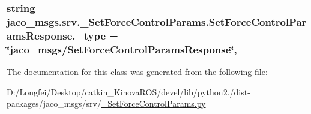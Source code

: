 \subsubsection[{\texorpdfstring{\+\_\+type}{_type}}]{\setlength{\rightskip}{0pt plus 5cm}string jaco\+\_\+msgs.\+srv.\+\_\+\+Set\+Force\+Control\+Params.\+Set\+Force\+Control\+Params\+Response.\+\_\+type = \char`\"{}jaco\+\_\+msgs/{\bf Set\+Force\+Control\+Params\+Response}\char`\"{}\hspace{0.3cm}{\ttfamily [static]}, {\ttfamily [private]}}\hypertarget{classjaco__msgs_1_1srv_1_1__SetForceControlParams_1_1SetForceControlParamsResponse_a2472e20c8a4d719aed1ca29213b233a1}{}\label{classjaco__msgs_1_1srv_1_1__SetForceControlParams_1_1SetForceControlParamsResponse_a2472e20c8a4d719aed1ca29213b233a1}


The documentation for this class was generated from the following file\+:\begin{DoxyCompactItemize}
\item 
D\+:/\+Longfei/\+Desktop/catkin\+\_\+\+Kinova\+R\+O\+S/devel/lib/python2./dist-\/packages/jaco\+\_\+msgs/srv/\hyperlink{__SetForceControlParams_8py}{\+\_\+\+Set\+Force\+Control\+Params.\+py}\end{DoxyCompactItemize}
